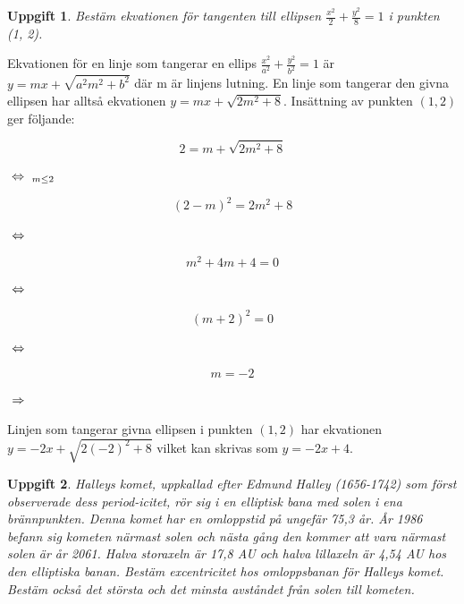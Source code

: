 \documentclass{article}
\newtheorem{thr}{Uppgift}
\begin{document}
\newpage


\begin{thr}
Bestäm ekvationen för tangenten till ellipsen $\frac{x^2}{2}+\frac{y^2}{8}=1$ i punkten (1, 2).
\end{thr}

Ekvationen för en linje som tangerar en ellips $\frac{x^2}{a^2}+\frac{y^2}{b^2}=1$ är $y=mx+\sqrt{a^2m^2+b^2}$ där m är linjens lutning. En linje som tangerar den givna ellipsen har alltså ekvationen $y=mx+\sqrt{2m^2+8}$. Insättning av punkten $(1, 2)$ ger följande: 

\begin{equation*}
    2=m+\sqrt{2m^2+8}
\end{equation*}

$\ \Leftrightarrow \ _{m \leq 2}$

\begin{equation*}
    (2-m)^2=2m^2+8
\end{equation*}

$\ \Leftrightarrow \ $

\begin{equation*}
    m^2+4m+4=0
\end{equation*}

$\ \Leftrightarrow \ $

\begin{equation*}
    (m+2)^2=0
\end{equation*}

$\ \Leftrightarrow \ $

\begin{equation*}
    m=-2
\end{equation*}

$\ \Rightarrow \ $

\vskip 0.5cm

Linjen som tangerar givna ellipsen i punkten $(1, 2)$ har ekvationen $y=-2x+\sqrt{2(-2)^2+8}$ vilket kan skrivas som $y=-2x+4$.

\newpage


\begin{thr}
Halleys komet, uppkallad efter Edmund Halley (1656-1742) som först observerade dess period-icitet, rör sig i en elliptisk bana med solen i ena brännpunkten. Denna komet har en omloppstid på ungefär 75,3 år. År 1986 befann sig kometen närmast solen och nästa gång den kommer att vara närmast solen är år 2061. Halva storaxeln är 17,8 AU och halva lillaxeln är 4,54 AU hos den elliptiska banan. Bestäm excentricitet hos omloppsbanan för Halleys komet. Bestäm också det största och det minsta avståndet från solen till kometen.
\end{thr}
\end{document}
